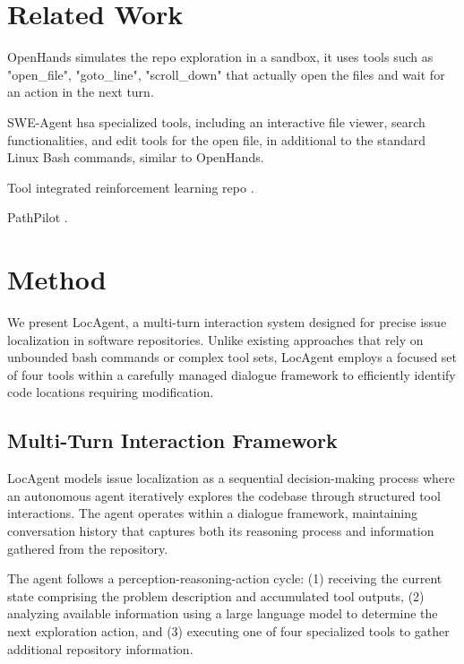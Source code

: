 \documentclass[11pt]{article}
\begin{document}


\section{Related Work}

OpenHands \citep{wang2025openhandsopenplatformai} simulates the repo exploration in a sandbox, it uses tools such as "open\_file", "goto\_line", "scroll\_down" that actually open the files and wait for an action in the next turn.

SWE-Agent \citep{yang2024sweagentagentcomputerinterfacesenable} hsa specialized tools, including an interactive file viewer, search functionalities, and edit tools for the open file, in additional to the standard Linux Bash commands, similar to OpenHands\citep{wang2025openhandsopenplatformai}.

Tool integrated reinforcement learning repo \cite{ma2025toolintegratedreinforcementlearningrepo}.

PathPilot \cite{li2025patchpilotcostefficientsoftwareengineering}.


\section{Method}

We present LocAgent, a multi-turn interaction system designed for precise issue localization in software repositories. Unlike existing approaches that rely on unbounded bash commands or complex tool sets, LocAgent employs a focused set of four tools within a carefully managed dialogue framework to efficiently identify code locations requiring modification.

\subsection{Multi-Turn Interaction Framework}

LocAgent models issue localization as a sequential decision-making process where an autonomous agent iteratively explores the codebase through structured tool interactions. The agent operates within a dialogue framework, maintaining conversation history that captures both its reasoning process and information gathered from the repository.

The agent follows a perception-reasoning-action cycle: (1) receiving the current state comprising the problem description and accumulated tool outputs, (2) analyzing available information using a large language model to determine the next exploration action, and (3) executing one of four specialized tools to gather additional repository information.
\end{document}
